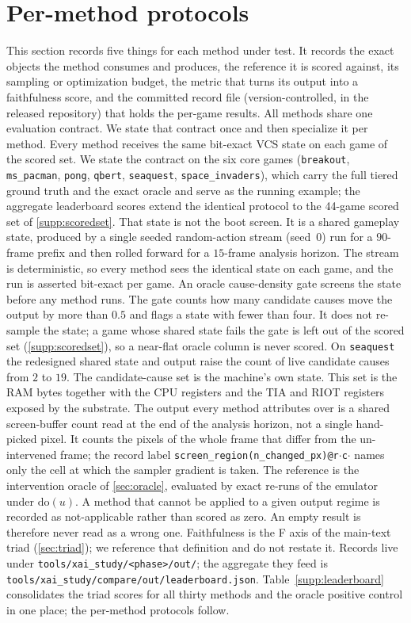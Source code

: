 \section{Per-method protocols}\label{supp:protocols}

This section records five things for each method under test. It records the exact objects the
method consumes and produces, the reference it is scored against, its sampling or optimization
budget, the metric that turns its output into a faithfulness score, and the committed record
file (version-controlled, in the released repository) that holds the per-game results. All methods share one evaluation contract. We state that
contract once and then specialize it per method. Every method receives the same bit-exact VCS
state on each game of the scored set. We state the contract on the six core games
(\texttt{breakout}, \texttt{ms\_pacman}, \texttt{pong}, \texttt{qbert}, \texttt{seaquest},
\texttt{space\_invaders}), which carry the full tiered ground truth and the exact oracle and
serve as the running example; the aggregate leaderboard scores extend the identical protocol
to the 44-game scored set of \Sectionname\ref{supp:scoredset}. That state is not the boot screen.
It is a shared gameplay state, produced by a single seeded random-action stream (seed~$0$) run
for a $90$-frame prefix and then rolled forward for a $15$-frame analysis horizon. The stream is
deterministic, so every method sees the identical state on each game, and the run is asserted
bit-exact per game. An oracle cause-density gate screens the state before any method runs. The
gate counts how many candidate causes move the output by more than $0.5$ and flags a state with
fewer than four. It does not re-sample the state; a game whose shared state fails the gate is
left out of the scored set (\Sectionname\ref{supp:scoredset}), so a near-flat oracle column is
never scored. On \texttt{seaquest} the redesigned shared state and output raise the count of
live candidate causes from $2$ to $19$.
The candidate-cause set is the machine's own state. This set is the RAM bytes together with the
CPU registers and the TIA and RIOT registers exposed by the substrate. The output every method
attributes over is a shared screen-buffer count read at the end of the analysis horizon, not a
single hand-picked pixel. It counts the pixels of the whole frame that differ from the
un-intervened frame; the record label \texttt{screen\_region(n\_changed\_px)@r$\cdot$c$\cdot$}
names only the cell at which the sampler gradient is taken. The reference is the intervention oracle of \Sectionname\ref{sec:oracle},
evaluated by exact re-runs of the emulator under $\mathrm{do}(u)$. A method that
cannot be applied to a given output regime is recorded as not-applicable rather than scored
as zero. An empty result is therefore never read as a wrong one. Faithfulness is the F
axis of the main-text triad (\Sectionname\ref{sec:triad}); we reference that definition and do not restate it.
Records live under \texttt{tools/xai\_study/<phase>/out/}; the aggregate they feed is
\texttt{tools/xai\_study/compare/out/leaderboard.json}.
Table~\ref{supp:leaderboard} consolidates the triad scores for all thirty methods and the
oracle positive control in one place; the per-method protocols follow.

